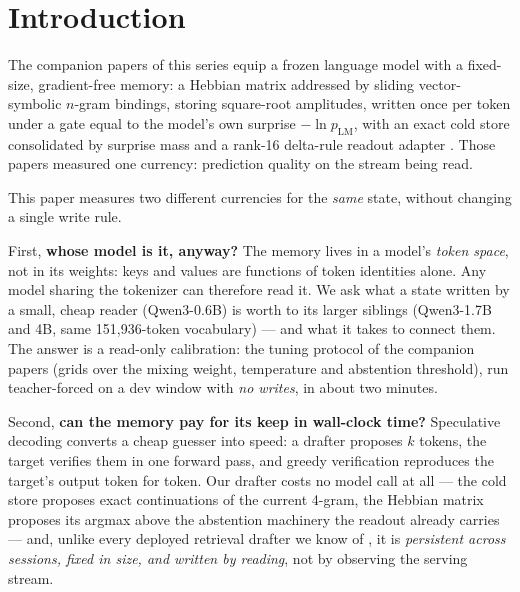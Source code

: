 \documentclass[11pt]{article}
\begin{document}
\section{Introduction}

The companion papers of this series \cite{sillage,router,hier,fw} equip a frozen language model with a fixed-size, gradient-free memory: a Hebbian matrix addressed by sliding vector-symbolic $n$-gram bindings, storing square-root amplitudes, written once per token under a gate equal to the model's own surprise $-\ln p_{\mathrm{LM}}$, with an exact cold store consolidated by surprise mass \cite{hier} and a rank-16 delta-rule readout adapter \cite{fw}. Those papers measured one currency: prediction quality on the stream being read.

This paper measures two different currencies for the \emph{same} state, without changing a single write rule.

First, \textbf{whose model is it, anyway?} The memory lives in a model's \emph{token space}, not in its weights: keys and values are functions of token identities alone. Any model sharing the tokenizer can therefore read it. We ask what a state written by a small, cheap reader (Qwen3-0.6B) is worth to its larger siblings (Qwen3-1.7B and 4B, same 151{,}936-token vocabulary) --- and what it takes to connect them. The answer is a read-only calibration: the tuning protocol of the companion papers (grids over the mixing weight, temperature and abstention threshold), run teacher-forced on a dev window with \emph{no writes}, in about two minutes.

Second, \textbf{can the memory pay for its keep in wall-clock time?} Speculative decoding \cite{leviathan,chen} converts a cheap guesser into speed: a drafter proposes $k$ tokens, the target verifies them in one forward pass, and greedy verification reproduces the target's output token for token. Our drafter costs no model call at all --- the cold store proposes exact continuations of the current 4-gram, the Hebbian matrix proposes its argmax above the abstention machinery the readout already carries --- and, unlike every deployed retrieval drafter we know of \cite{pld,rest,suffix,nest,omnidraft}, it is \emph{persistent across sessions, fixed in size, and written by reading}, not by observing the serving stream.
\end{document}
